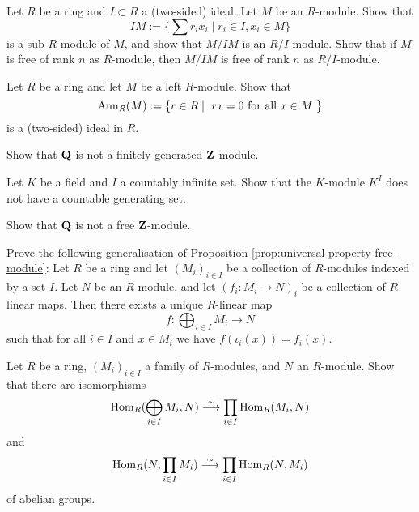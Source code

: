\begin{exercise}\label{exc:module-by-ideal}
Let $R$ be a ring and $I\subset R$ a (two-sided) ideal. Let $M$ be an $R$-module. Show that
\[
	IM := \{ \sum r_ix_i \mid r_i\in I, x_i\in M \}
\]
is a sub-$R$-module of $M$, and show that $M/IM$ is an $R/I$-module. Show that if $M$ is free of rank $n$ as $R$-module, then $M/IM$ is free of rank $n$ as $R/I$-module.
\end{exercise}

\begin{exercise}\label{exc:annihilator}
Let $R$ be a ring and let $M$ be a left $R$-module. Show that
\[
	\operatorname{Ann}_R( M ) := \{ r \in R \mid \text{ $rx=0$ for all $x\in M$ } \}
\]
is a (two-sided) ideal in $R$.
\end{exercise}


\begin{exercise}
Show that ${\mathbf{Q}}$ is not a finitely generated ${\mathbf{Z}}$-module.
\end{exercise}

\begin{exercise}
Let $K$ be a field and $I$ a countably infinite set. Show that the $K$-module $K^{I}$ does not have a countable generating set.
\end{exercise}


\begin{exercise}
Show that ${\mathbf{Q}}$ is not a free ${\mathbf{Z}}$-module.
\end{exercise}

\begin{exercise}Prove the following generalisation of Proposition \ref{prop:universal-property-free-module}: Let $R$ be a ring and let $(M_i)_{i\in I}$ be a collection of $R$-modules indexed by a set $I$. Let $N$ be an $R$-module, and let $(f_i\colon M_i \to N)_i$ be a collection of $R$-linear maps. Then there exists a unique $R$-linear map
\[
	f\colon \bigoplus_{i\in I} M_i \to N
\]
such that for all $i\in I$ and $x\in M_i$ we have $f(\iota_i(x)) = f_i(x)$.
\end{exercise}


\begin{exercise}\label{exc:universal-property-direct-sum}
Let $R$ be a ring, $(M_i)_{i\in I}$ a family of $R$-modules, and $N$ an $R$-module. Show that there are
isomorphisms
\[
	\operatorname{Hom}_R(\bigoplus_{i\in I} M_i, N) \overset{\sim}{\longrightarrow} \prod_{i\in I} \operatorname{Hom}_R(M_i,N)
\]
and
\[
	\operatorname{Hom}_R(N, \prod_{i\in I} M_i) \overset{\sim}{\longrightarrow} \prod_{i\in I} \operatorname{Hom}_R(N,M_i)
\]
of abelian groups.
\end{exercise}

